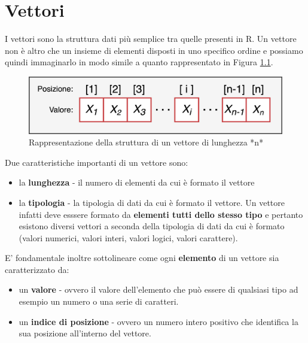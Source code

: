 \documentclass[
]{book}
\providecommand{\tightlist}{%
  \setlength{\itemsep}{0pt}\setlength{\parskip}{0pt}}
\begin{document}
\hypertarget{vector}{%
\chapter{Vettori}\label{vector}}

I vettori sono la struttura dati più semplice tra quelle presenti in R. Un vettore non è altro che un insieme di elementi disposti in uno specifico ordine e possiamo quindi immaginarlo in modo simile a quanto rappresentato in Figura \ref{fig:vector}.

\begin{figure}

{\centering \includegraphics[width=0.65\linewidth]{images/vector} 

}

\caption{Rappresentazione della struttura di un vettore di lunghezza *n*}\label{fig:vector}
\end{figure}

Due caratteristiche importanti di un vettore sono:

\begin{itemize}
\tightlist
\item
  la \textbf{lunghezza} - il numero di elementi da cui è formato il vettore
\item
  la \textbf{tipologia} - la tipologia di dati da cui è formato il vettore. Un vettore infatti deve esssere formato da \textbf{elementi tutti dello stesso tipo} e pertanto esistono diversi vettori a seconda della tipologia di dati da cui è formato (valori numerici, valori interi, valori logici, valori carattere).
\end{itemize}

E' fondamentale inoltre sottolineare come ogni \textbf{elemento} di un vettore sia caratterizzato da:

\begin{itemize}
\tightlist
\item
  un \textbf{valore} - ovvero il valore dell'elemento che può essere di qualsiasi tipo ad esempio un numero o una serie di caratteri.
\item
  un \textbf{indice di posizione} - ovvero un numero intero positivo che identifica la sua posizione all'interno del vettore.
\end{itemize}
\end{document}
